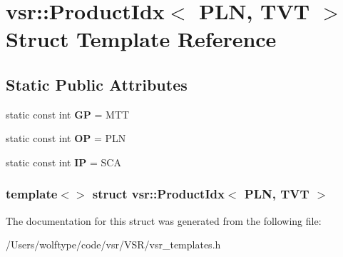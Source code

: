 \hypertarget{structvsr_1_1_product_idx_3_01_p_l_n_00_01_t_v_t_01_4}{\section{vsr\-:\-:Product\-Idx$<$ P\-L\-N, T\-V\-T $>$ Struct Template Reference}
\label{structvsr_1_1_product_idx_3_01_p_l_n_00_01_t_v_t_01_4}
}
\subsection*{Static Public Attributes}
\begin{DoxyCompactItemize}
\item 
\hypertarget{structvsr_1_1_product_idx_3_01_p_l_n_00_01_t_v_t_01_4_a5e2bda5e7dd8f645cb31d99773d5de5a}{static const int {\bfseries G\-P} = M\-T\-T}\label{structvsr_1_1_product_idx_3_01_p_l_n_00_01_t_v_t_01_4_a5e2bda5e7dd8f645cb31d99773d5de5a}

\item 
\hypertarget{structvsr_1_1_product_idx_3_01_p_l_n_00_01_t_v_t_01_4_a8152dc01f9ac21ad9d1bb96c7a80f8da}{static const int {\bfseries O\-P} = P\-L\-N}\label{structvsr_1_1_product_idx_3_01_p_l_n_00_01_t_v_t_01_4_a8152dc01f9ac21ad9d1bb96c7a80f8da}

\item 
\hypertarget{structvsr_1_1_product_idx_3_01_p_l_n_00_01_t_v_t_01_4_a27951dcaba1e4ae989cfaaf4edeb9608}{static const int {\bfseries I\-P} = S\-C\-A}\label{structvsr_1_1_product_idx_3_01_p_l_n_00_01_t_v_t_01_4_a27951dcaba1e4ae989cfaaf4edeb9608}

\end{DoxyCompactItemize}
\subsubsection*{template$<$$>$ struct vsr\-::\-Product\-Idx$<$ P\-L\-N, T\-V\-T $>$}



The documentation for this struct was generated from the following file\-:\begin{DoxyCompactItemize}
\item 
/\-Users/wolftype/code/vsr/\-V\-S\-R/vsr\-\_\-templates.\-h\end{DoxyCompactItemize}
